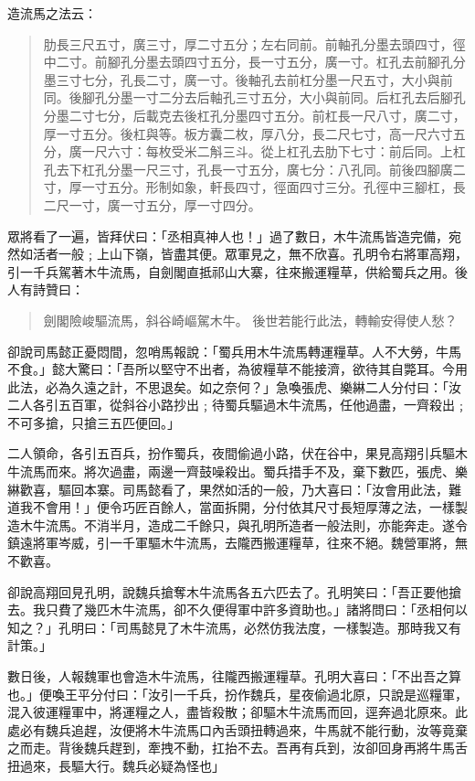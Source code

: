 造流馬之法云：

\begin{quote}
肋長三尺五寸，廣三寸，厚二寸五分；左右同前。前軸孔分墨去頭四寸，徑中二寸。前腳孔分墨去頭四寸五分，長一寸五分，廣一寸。杠孔去前腳孔分墨三寸七分，孔長二寸，廣一寸。後軸孔去前杠分墨一尺五寸，大小與前同。後腳孔分墨一寸二分去后軸孔三寸五分，大小與前同。后杠孔去后腳孔分墨二寸七分，后載克去後杠孔分墨四寸五分。前杠長一尺八寸，廣二寸，厚一寸五分。後杠與等。板方囊二枚，厚八分，長二尺七寸，高一尺六寸五分，廣一尺六寸：每枚受米二斛三斗。從上杠孔去肋下七寸：前后同。上杠孔去下杠孔分墨一尺三寸，孔長一寸五分，廣七分：八孔同。前後四腳廣二寸，厚一寸五分。形制如象，軒長四寸，徑面四寸三分。孔徑中三腳杠，長二尺一寸，廣一寸五分，厚一寸四分。
\end{quote}

眾將看了一遍，皆拜伏曰：「丞相真神人也！」過了數日，木牛流馬皆造完備，宛然如活者一般﹔上山下嶺，皆盡其便。眾軍見之，無不欣喜。孔明令右將軍高翔，引一千兵駕著木牛流馬，自劍閣直抵祁山大寨，往來搬運糧草，供給蜀兵之用。後人有詩贊曰：

\begin{quote}
劍閣險峻驅流馬，斜谷崎嶇駕木牛。
後世若能行此法，轉輸安得使人愁？
\end{quote}

卻說司馬懿正憂悶間，忽哨馬報說：「蜀兵用木牛流馬轉運糧草。人不大勞，牛馬不食。」懿大驚曰：「吾所以堅守不出者，為彼糧草不能接濟，欲待其自斃耳。今用此法，必為久遠之計，不思退矣。如之奈何？」急喚張虎、樂綝二人分付曰：「汝二人各引五百軍，從斜谷小路抄出﹔待蜀兵驅過木牛流馬，任他過盡，一齊殺出﹔不可多搶，只搶三五匹便回。」

二人領命，各引五百兵，扮作蜀兵，夜間偷過小路，伏在谷中，果見高翔引兵驅木牛流馬而來。將次過盡，兩邊一齊鼓噪殺出。蜀兵措手不及，棄下數匹，張虎、樂綝歡喜，驅回本寨。司馬懿看了，果然如活的一般，乃大喜曰：「汝會用此法，難道我不會用！」便令巧匠百餘人，當面拆開，分付依其尺寸長短厚薄之法，一樣製造木牛流馬。不消半月，造成二千餘只，與孔明所造者一般法則，亦能奔走。遂令鎮遠將軍岑威，引一千軍驅木牛流馬，去隴西搬運糧草，往來不絕。魏營軍將，無不歡喜。

卻說高翔回見孔明，說魏兵搶奪木牛流馬各五六匹去了。孔明笑曰：「吾正要他搶去。我只費了幾匹木牛流馬，卻不久便得軍中許多資助也。」諸將問曰：「丞相何以知之？」孔明曰：「司馬懿見了木牛流馬，必然仿我法度，一樣製造。那時我又有計策。」

數日後，人報魏軍也會造木牛流馬，往隴西搬運糧草。孔明大喜曰：「不出吾之算也。」便喚王平分付曰：「汝引一千兵，扮作魏兵，星夜偷過北原，只說是巡糧軍，混入彼運糧軍中，將運糧之人，盡皆殺散；卻驅木牛流馬而回，逕奔過北原來。此處必有魏兵追趕，汝便將木牛流馬口內舌頭扭轉過來，牛馬就不能行動，汝等竟棄之而走。背後魏兵趕到，牽拽不動，扛抬不去。吾再有兵到，汝卻回身再將牛馬舌扭過來，長驅大行。魏兵必疑為怪也」

